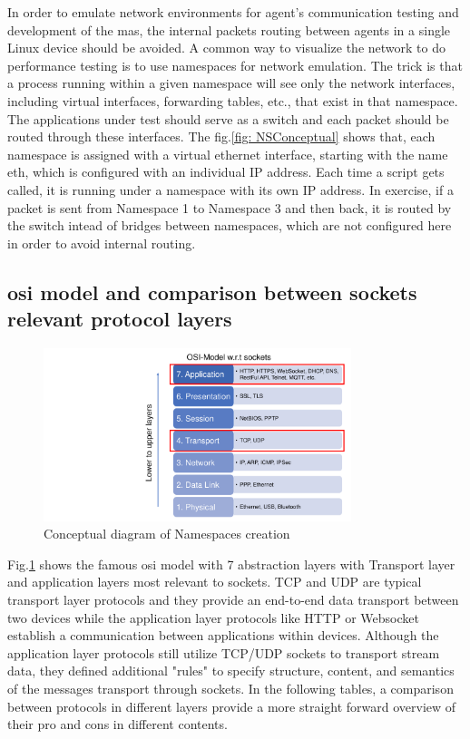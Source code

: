In order to emulate network environments for agent's communication testing and development of the \gls{mas}, the internal packets routing between agents in a single Linux device should be avoided. A common way to visualize the network to do performance testing is to use namespaces for network emulation. The trick is that a process running within a given namespace will see only the network interfaces, including virtual interfaces, forwarding tables, etc., that exist in that namespace. The applications under test should serve as a switch and each packet should be routed through these interfaces. The fig.\ref{fig: NSConceptual} shows that, each namespace is assigned with a virtual ethernet interface, starting with the name eth, which is configured with an individual IP address. Each time a script gets called, it is running under a namespace with its own IP address. In exercise, if a packet is sent from Namespace 1 to Namespace 3 and then back, it is routed by the switch intead of bridges between namespaces, which are not configured here in order to avoid internal routing.

\subsection{\gls{osi} model and comparison between sockets relevant protocol layers}
\begin{figure}[htbp]
\includegraphics[width=0.8\textwidth]{figures/OSI.pdf}
\centering
\caption{Conceptual diagram of Namespaces creation\label{fig: OSI}}
\end{figure}

Fig.\ref{fig: OSI} shows the famous \gls{osi} model with 7 abstraction layers with Transport layer and application layers most relevant to sockets. 
TCP and UDP are typical transport layer protocols and they provide an end-to-end data transport between two devices while the application layer protocols like HTTP or Websocket establish a communication between applications within devices. 
Although the application layer protocols still utilize TCP/UDP sockets to transport stream data, they defined additional "rules" to specify structure, content, and semantics of the messages transport through sockets. 
In the following tables, a comparison between protocols in different layers provide a more straight forward overview of their pro and cons in different contents.


